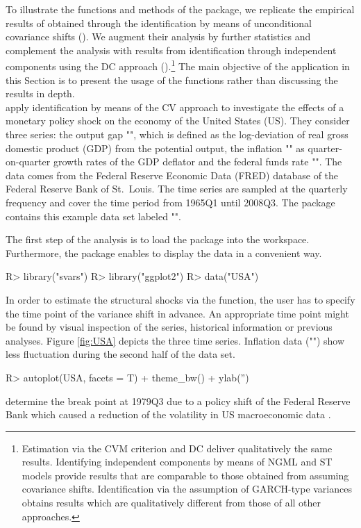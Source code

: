 \documentclass[nojss]{jss}\usepackage[]{graphicx}\usepackage[]{color}
\begin{document}
To illustrate the functions and methods of the  package, we replicate the empirical results of \cite{HerwartzPloedt2016} obtained through the identification by means of unconditional covariance shifts (). We augment their analysis by further statistics and complement the analysis with results from identification through independent components using the DC approach ().\footnote{Estimation via the CVM criterion and DC deliver qualitatively the same results. Identifying independent components by means of NGML and ST models provide results that are comparable to those obtained from assuming covariance shifts. Identification via the assumption of GARCH-type variances obtains  results which are qualitatively different from those of all other approaches.} The main objective of the application in this Section is to present the usage of the functions rather than discussing the results in depth. \\
\cite{HerwartzPloedt2016} apply identification by means of the CV approach to investigate the effects of a monetary policy shock on the economy of the United States (US). They consider three series: the output gap "", which is defined as the log-deviation of real gross domestic product (GDP) from the potential output, the inflation "" as quarter-on-quarter growth rates of the GDP deflator and the federal funds rate "". The data comes from the Federal Reserve Economic Data (FRED) database of the Federal Reserve Bank of St.~Louis. The time series are sampled at the quarterly frequency and cover the time period from 1965Q1 until 2008Q3. The  package contains this example data set labeled "".

The first step of the analysis is to load the  package into the workspace. Furthermore, the  \citep{ggplot2} package enables to display the data in a convenient way.
\begin{CodeChunk}
\begin{CodeInput}
R> library("svars")
R> library("ggplot2")
R> data("USA")
\end{CodeInput}
\end{CodeChunk}
In order to estimate the structural shocks via the  function, the user has to specify the time point of the variance shift in advance. An appropriate time point might be found by visual inspection of the series, historical information or previous analyses. Figure \ref{fig:USA} depicts the three time series. Inflation data ("") show less fluctuation during the second half of the data set.
\begin{CodeChunk}
\begin{CodeInput}
R> autoplot(USA, facets = T) + theme_bw() + ylab('')
\end{CodeInput}
\end{CodeChunk}
\cite{HerwartzPloedt2016} determine the break point at 1979Q3 due to a policy shift of the Federal Reserve Bank which caused a reduction of the volatility in US macroeconomic data \citep{SW2003}.
\end{document}
